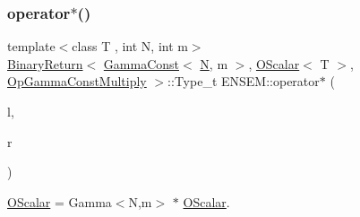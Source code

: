 \subsubsection{\texorpdfstring{operator$\ast$()}{operator*()}\hspace{0.1cm}{\footnotesize\ttfamily [2/5]}}
{\footnotesize\ttfamily template$<$class T , int N, int m$>$ \\
\mbox{\hyperlink{structENSEM_1_1BinaryReturn}{Binary\+Return}}$<$ \mbox{\hyperlink{classENSEM_1_1GammaConst}{Gamma\+Const}}$<$ \mbox{\hyperlink{adat__devel_2lib_2hadron_2operator__name__util_8cc_a7722c8ecbb62d99aee7ce68b1752f337}{N}}, m $>$, \mbox{\hyperlink{classENSEM_1_1OScalar}{O\+Scalar}}$<$ T $>$, \mbox{\hyperlink{structENSEM_1_1OpGammaConstMultiply}{Op\+Gamma\+Const\+Multiply}} $>$\+::Type\+\_\+t E\+N\+S\+E\+M\+::operator$\ast$ (\begin{DoxyParamCaption}\item[{const \mbox{\hyperlink{classENSEM_1_1GammaConst}{Gamma\+Const}}$<$ \mbox{\hyperlink{adat__devel_2lib_2hadron_2operator__name__util_8cc_a7722c8ecbb62d99aee7ce68b1752f337}{N}}, m $>$ \&}]{l,  }\item[{const \mbox{\hyperlink{classENSEM_1_1OScalar}{O\+Scalar}}$<$ T $>$ \&}]{r }\end{DoxyParamCaption})\hspace{0.3cm}{\ttfamily [inline]}}



\mbox{\hyperlink{classENSEM_1_1OScalar}{O\+Scalar}} = Gamma$<$\+N,m$>$ $\ast$ \mbox{\hyperlink{classENSEM_1_1OScalar}{O\+Scalar}}. 

\mbox{\label{group__obsscalar_ga1a9ed6642b9c94843e7a8c143c2f0236}} 
